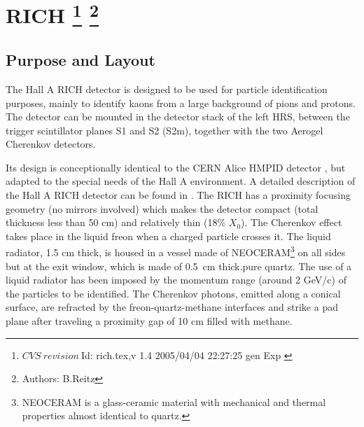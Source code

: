 \chapter[RICH]{RICH
\label{sec:rich}
\footnote{
  $CVS~revision~ $Id: rich.tex,v 1.4 2005/04/04 22:27:25 gen Exp $ $
}
\footnote{Authors: B.Reitz }
}

\section{Purpose and Layout} 

The Hall A RICH detector is designed to be used for particle identification purposes, mainly 
to identify kaons from a large background of pions and protons. The detector can be mounted in
the detector stack of the left HRS, between the trigger scintillator planes S1 and S2 (S2m),
together with the two Aerogel Cherenkov detectors.

Its design is conceptionally identical 
to the CERN Alice HMPID detector \cite{Beole:1998yq}, but adapted to the special needs
of the Hall A environment.
A detailed description of the Hall A RICH detector can be found in \cite{hallarep02}.
The RICH has a proximity focusing geometry (no mirrors involved) which makes the 
detector compact (total thickness less than 50 cm) and relatively thin (18\% $X_0$).
The Cherenkov effect takes place in the liquid freon 
when a charged particle 
crosses it.
The liquid radiator, 1.5 cm thick, 
is housed in a vessel made of NEOCERAM\footnote{NEOCERAM is
a glass-ceramic material with mechanical and thermal properties
almost identical to quartz.}    
on all sides but
at the exit window, which is made of 0.5~cm thick.pure quartz.  
The use of a liquid radiator has been imposed by the momentum range (around
 2 GeV/c) of the particles to be identified.
The Cherenkov photons, emitted along a conical surface,
are refracted by the 
freon-quartz-methane interfaces and strike 
a pad plane after traveling a proximity gap 
of 10 cm filled with methane.


